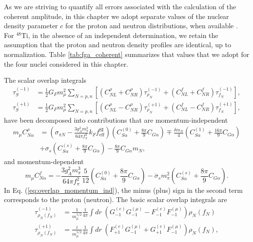 \documentclass{book}[letterpaper,12pt]
\begin{document}
As we are striving to quantify all errors associated with the calculation of the coherent amplitude, in this chapter we adopt separate values of the nuclear density parameter $c$ for the proton and neutron distributions, when available \cite{Garcia-Recio:1991ocp}. For $^{48}$Ti, in the absence of an independent determination, we retain the assumption that the proton and neutron density profiles are identical, up to normalization. Table \ref{tab:fga_coherent} summarizes that values that we adopt for the four nuclei considered in this chapter.

The scalar overlap integrals 
\begin{equation}
\begin{split}
\tau_S^{(-1)}&=\frac{1}{2}G_Fm_{\mu}^2\sum_{N=p,n}\left[\left(C^{\rho}_{NL}+C^{\rho}_{NR}\right)\tau^{(-1)}_{\rho_N}+\left(C^f_{NL}+C^f_{NR}\right)\tau^{(-1)}_{f_N}\right],\\
\tau_S^{(+1)}&=\frac{1}{2}G_Fm_{\mu}^2\sum_{N=p,n}\left[\left(C_{NL}^{\rho}-C_{NR}^{\rho}\right)\tau_{\rho_N}^{(+1)}+\left(C_{NL}^f-C_{NR}^f\right)\tau_{f_N}^{(+1)}\right],
\end{split}
\end{equation}
have been decomposed into contributions that are momentum-independent
\begin{equation}
\begin{split}
m_{\mu}C_{N\alpha}^{\rho}&=\left(\sigma_{\pi N}-\frac{3g_A^2m_{\pi}^2}{64\pi f_{\pi}^2}k_Ff^\mathrm{SI}_\mathrm{eff}\right)\left(C_{S\alpha}^{(0)}+\frac{8\pi}{9}C_{G\alpha}\right)\mp\frac{\delta m_N}{4}\left(C_{S\alpha}^{(1)}+\frac{16\pi}{9}C_{G\alpha}\right)\\
&+\sigma_s\left(C_{S\alpha}^{(s)}+\frac{8\pi}{9}C_{G\alpha}\right)-\frac{8\pi}{9}C_{G\alpha}m_N,
\label{eq:overlap_momentum_ind}
\end{split}
\end{equation}
and momentum-dependent
\begin{equation}
m_{\mu}C_{N\alpha}^f=-\frac{3g_A^2m_{\pi}^3}{64\pi f_{\pi}^2}\frac{5}{12}\left(C_{S\alpha}^{(0)}+\frac{8\pi}{9}C_{G\alpha}\right)-\dot{\sigma}_sm_{\pi}^2\left(C_{S\alpha}^{(s)}+\frac{8\pi}{9}C_{G\alpha}\right).
\end{equation}
In Eq. (\ref{eq:overlap_momentum_ind}), the minus (plus) sign in the second term corresponds to the proton (neutron). The basic scalar overlap integrals are
\begin{equation}
\begin{split}
\tau^{(-1)}_{\rho_N(f_N)}&=\frac{1}{m_{\mu}^{5/2}}\frac{1}{4\pi}\int dr\;\left(G^{(e)}_{-1}G^{(\mu)}_{-1}-F_{-1}^{(e)}F_{-1}^{(\mu)}\right)\rho_N(f_N)\\
\tau^{(+1)}_{\rho_N(f_N)}&=\frac{i}{m_{\mu}^{5/2}}\frac{1}{4\pi}\int dr\;\left(F_{+1}^{(e)}G_{-1}^{(\mu)}+G_{+1}^{(e)}F_{-1}^{(\mu)}\right)\rho_N(f_N),
\end{split}
\end{equation}
\end{document}
